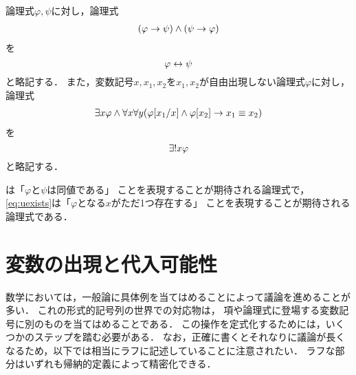 \begin{Def} \label{Def:AbbreviatioForFormula}
	論理式\(\varphi, \psi\)に対し，論理式
	\begin{align*}
		\paren{\varphi \to \psi} \land \paren{\psi \to \varphi}
	\end{align*}
	を
	\begin{equation}
		\varphi \leftrightarrow \psi
		\label{eq:formulaequiv}
	\end{equation}
	と略記する．
	また，変数記号\(x, x_1, x_2\)を\(x_1, x_2\)が自由出現しない論理式\(\varphi\)に対し，論理式
	\begin{align*}
		\exists x \varphi \land \forall x \forall y \paren{\subst{\varphi}{x_1/x} \land \subst{\varphi}{x_2} \to x_1 \objeq x_2}
	\end{align*}
	を
	\begin{equation}
		{\exists !} x \varphi
		\label{eq:uexists}
	\end{equation}
	と略記する．

	は「\(\varphi\)と\(\psi\)は同値である」
	ことを表現することが期待される論理式で，
	\cref{eq:uexists}は「\(\varphi\)となる\(x\)がただ1つ存在する」
	ことを表現することが期待される論理式である．
\end{Def}

\section{変数の出現と代入可能性} \label{sec:substitution}

数学においては，一般論に具体例を当てはめることによって議論を進めることが多い．
これの形式的記号列の世界での対応物は，
項や論理式に登場する変数記号に別のものを当てはめることである．
この操作を定式化するためには，いくつかのステップを踏む必要がある．
なお，正確に書くとそれなりに議論が長くなるため，以下では相当にラフに記述していることに注意されたい．
ラフな部分はいずれも帰納的定義によって精密化できる．


